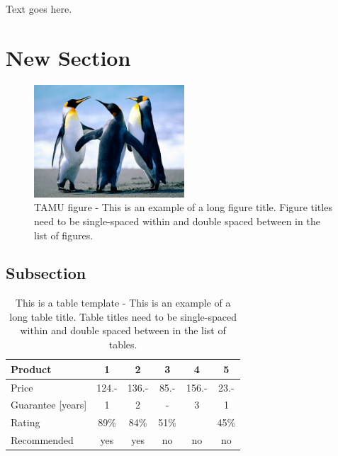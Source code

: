 

Text goes here.

\section{New Section}

\lipsum[1-3]

\begin{figure}[!h]
	\centering
	\includegraphics[width=0.5\textwidth]{./Figures/Penguins.jpg}
	\caption{TAMU figure - This is an example of a long figure title.  Figure titles need to be single-spaced within and double spaced between in the list of figures.}
	\label{fig:landscapepenguins}
\end{figure}

\lipsum[4]
\subsection{Subsection}
\begin{table}[H]
\centering
\caption{This is a table template - This is an example of a long table title.  Table titles need to be single-spaced within and double spaced between in the list of tables.}
\begin{tabular}{|l|c|c|c|c|c|}
\hline
Product & 1 & 2 & 3 & 4 & 5\\
\hline
Price & 124.- & 136.- & 85.- & 156.- & 23.-\\
Guarantee [years] & 1 & 2 & - & 3 & 1\\
Rating & 89\% & 84\% & 51\% & & 45\%\\
\hline
\hline
Recommended & yes & yes & no & no & no\\
\hline
\end{tabular}
\label{tab:template1}
\end{table}


